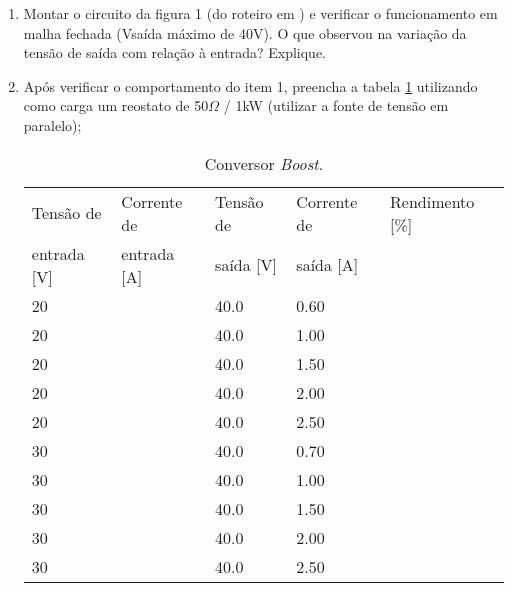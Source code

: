         \begin{enumerate}
          \item Montar o circuito da figura 1 (do roteiro em \cite{Roteiro}) e verificar o funcionamento em malha fechada (Vsaída máximo de 40V). O que observou na variação da tensão de saída com relação à entrada? Explique.
          
          \item Após verificar o comportamento do item 1, preencha a tabela \ref{tab:boost} utilizando  como carga um reostato de 50$\Omega$ / 1kW (utilizar a fonte de tensão em paralelo);
          
          	\begin{small}
              \begin{table}[H]
                \begin{center}
                  \caption{Conversor \textit{Boost}.}
                  \begin{tabular}{l|l|l|l|l}
                    \hline
                    Tensão de   &  Corrente de 	& Tensão de & Corrente de	& Rendimento [\%]	\\
                    entrada [V] &  entrada [A] 	& saída [V] & saída [A]  	& \\
                    \hline
                    20 		& 			& 40.0		& 0.60			& 	\\
                    \hline
                    20		& 			& 40.0		& 1.00			& 	\\
                    \hline
                    20		& 			& 40.0		& 1.50			& 	\\
                    \hline
                    20		& 			& 40.0		& 2.00			& 	\\
                    \hline
                    20		& 			& 40.0		& 2.50			& 	\\
                    \hline
                    30		& 			& 40.0		& 0.70			& 	\\
                    \hline
                    30		& 			& 40.0		& 1.00			& 	\\
                    \hline
                    30		& 			& 40.0		& 1.50			& 	\\
                    \hline
                    30		& 			& 40.0		& 2.00			& 	\\
                    \hline
                    30		& 			& 40.0		& 2.50			& 	\\
                    \hline
                  \end{tabular}
                  \label{tab:boost}
                  

\end{center}
\end{table}
\end{small}
\end{enumerate}
